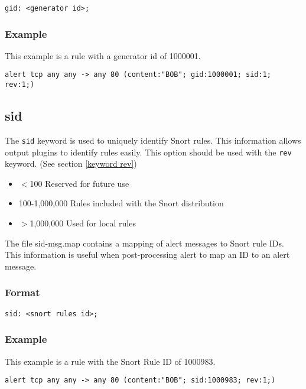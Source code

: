 \documentclass[english]{report}
\begin{document}
\begin{verbatim}
gid: <generator id>;
\end{verbatim}

\subsubsection{Example}
This example is a rule with a generator id of 1000001. 
\begin{verbatim}
alert tcp any any -> any 80 (content:"BOB"; gid:1000001; sid:1; rev:1;)
\end{verbatim}


\subsection{sid\label{keyword sid}}

The \texttt{sid} keyword is used to uniquely identify Snort rules. This information
allows output plugins to identify rules easily.  This option should be used
with the \texttt{rev} keyword.  (See section \ref{keyword rev})

\begin{itemize}
\item $<$100 Reserved for future use
\item 100-1,000,000 Rules included with the Snort distribution
\item $>$1,000,000 Used for local rules
\end{itemize}

The file sid-msg.map contains a mapping of alert messages to Snort rule IDs.
This information is useful when post-processing alert to map an ID to an alert
message.  

\subsubsection{Format}

\begin{verbatim}
sid: <snort rules id>;
\end{verbatim}

\subsubsection{Example}
This example is a rule with the Snort Rule ID of 1000983.
\begin{verbatim}
alert tcp any any -> any 80 (content:"BOB"; sid:1000983; rev:1;)
\end{verbatim}
\end{document}

